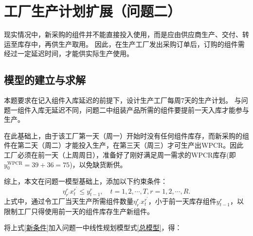 \section{工厂生产计划扩展（问题二）} %
\label{sec:工厂生产计划扩展}

现实情况中，新采购的组件并不能直接投入使用，而是应由供应商生产、交付、转运至库存中，再供生产取用。
因此，在生产工厂发出采购订单后，订购的组件需经过一定延迟时间，才能供实际生产使用。

\subsection{模型的建立与求解} %
\label{sub:模型的建立与求解}


本题要求在记入组件入库延迟的前提下，设计生产工厂每周7天的生产计划。
与问题一组件入库无延迟不同，问题二中组装产品所需的组件要提前一天入库才能参与生产。

在此基础上，由于该工厂第一天（周一）开始时没有任何组件库存，而新采购的组件在第二天（周二）才能投入生产，在第三天（周三）才可生产出WPCR。因此工厂必须在前一天（上周周日），准备好了刚好满足周一需求的WPCR库存(即$y_0^{\text{WPCR}} = 39+36=75$)，以免缺货断供。

综上，本文在问题一模型基础上，添加以下约束条件：
\begin{equation}\label{新条件}
	\eta_{r^{\prime}}^{r} x_{t}^{r^{\prime}} \leqslant y_{t-1}^{r},\quad t=1,2, \cdots, T, r=1,2, \cdots, R.
\end{equation}
上式中，通过令工厂当天生产所需组件数量$\eta_{r^{\prime}}^{r} x_{t}^{r^{\prime}}$，小于前一天库存组件$y_{t-1}^{r}$，以限制工厂只得使用前一天的组件库存生产新组件。

将上式\ref{新条件}加入问题一中线性规划模型式\ref{总模型}，得：

